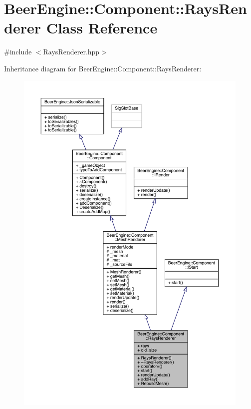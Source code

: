\hypertarget{class_beer_engine_1_1_component_1_1_rays_renderer}{}\section{Beer\+Engine\+:\+:Component\+:\+:Rays\+Renderer Class Reference}
\label{class_beer_engine_1_1_component_1_1_rays_renderer}


{\ttfamily \#include $<$Rays\+Renderer.\+hpp$>$}



Inheritance diagram for Beer\+Engine\+:\+:Component\+:\+:Rays\+Renderer\+:\nopagebreak
\begin{figure}[H]
\begin{center}
\leavevmode
\includegraphics[width=350pt]{class_beer_engine_1_1_component_1_1_rays_renderer__inherit__graph}
\end{center}
\end{figure}


